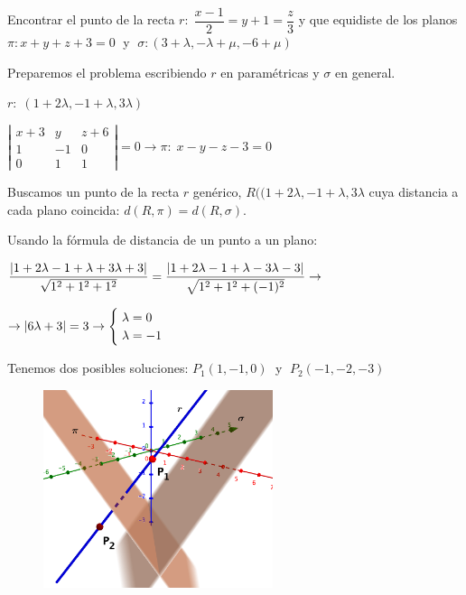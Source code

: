 \begin{ejre}
	Encontrar el punto de la recta $r:\; \dfrac {x-1}2=y+1=\dfrac z 3$ y que equidiste de los planos $\pi: x+y+z+3=0\;$ y $\;\sigma: (3+\lambda,-\lambda+\mu,-6+\mu)$
\end{ejre}
\begin{proofw}\renewcommand{\qedsymbol}{$\diamond$}	
\noindent Preparemos el problema escribiendo $r$ en paramétricas y $\sigma$ en general.

\noindent $r:\; (1+2\lambda,-1+\lambda,3\lambda)$

\noindent $\left| \begin{matrix} x+3&y&z+6\\1&-1&0\\0&1&1\end{matrix}\right|=0\to \pi:\; x-y-z-3=0$

\noindent Buscamos un punto de la recta $r$ genérico, $R((1+2\lambda,-1+\lambda,3\lambda$ cuya distancia a cada plano coincida: $d(R,\pi)=d(R,\sigma)$.

\noindent Usando la fórmula de distancia de un punto a un plano:

\noindent $\dfrac {\abs{1+2\lambda-1+\lambda+3\lambda+3}}{\sqrt{1^2+1^2+1^2}}=\dfrac{\abs{1+2\lambda-1+\lambda-3\lambda-3}}{\sqrt{1^2+1^2+(-1)^2}} \to$

\noindent $\to \abs{6\lambda+3}=3 \to \begin{cases} \; \lambda =0 \\ \; \lambda =-1 \end{cases}$

\noindent Tenemos dos posibles soluciones: $P_1(1,-1,0)\;$ y $\;P_2(-1,-2,-3)$

	\begin{figure}[H]
		\centering
		\includegraphics[width=0.6\textwidth]{imagenes/imagenes11/T11IM27.png}
	\end{figure}

\end{proofw}


